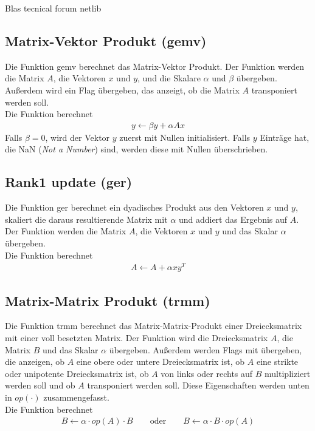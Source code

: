 \cite{blast}
Blas tecnical forum netlib

\subsection{Matrix-Vektor Produkt (gemv)}
Die Funktion \glqq gemv\grqq{} berechnet das Matrix-Vektor Produkt.
Der Funktion werden die Matrix $A$, die Vektoren $x$ und $y$, und die Skalare $\alpha$ und $\beta$ übergeben. Außerdem wird ein Flag übergeben, das anzeigt, ob die Matrix $A$ transponiert werden soll.\\
Die Funktion berechnet
\begin{align}
y \leftarrow \beta  y + \alpha A x 
\end{align}
Falls $\beta = 0$, wird der Vektor $y$ zuerst mit Nullen initialisiert. Falls $y$ Einträge hat, die NaN (\textit{Not a Number}) sind, werden diese mit Nullen überschrieben.

\subsection{Rank1 update (ger)}
Die Funktion \glqq ger\grqq{}  berechnet ein dyadisches Produkt aus den Vektoren $x$ und $y$, skaliert die daraus resultierende Matrix mit $\alpha$ und addiert das Ergebnis auf $A$.\\
Der Funktion werden die Matrix $A$, die Vektoren $x$ und $y$ und das Skalar $\alpha$ übergeben.\\
Die Funktion berechnet
\begin{align}
A \leftarrow A + \alpha  x y^T
\end{align}

\subsection{Matrix-Matrix Produkt (trmm)} \label{fkt:trmm}
Die Funktion \glqq trmm\grqq{} berechnet das Matrix-Matrix-Produkt einer Dreiecksmatrix mit einer voll besetzten Matrix.
Der Funktion wird die Dreiecksmatrix $A$, die Matrix $B$ und das Skalar $\alpha$ übergeben. Außerdem werden Flags mit übergeben, die anzeigen, ob $A$ eine obere oder untere Dreiecksmatrix ist, ob $A$ eine strikte oder unipotente Dreiecksmatrix ist, ob $A$ von links oder rechts auf $B$ multipliziert werden soll und ob $A$ transponiert werden soll. Diese Eigenschaften werden unten in $op(\cdot)$ zusammengefasst. \\
Die Funktion berechnet
\begin{align}
B \leftarrow  \alpha \cdot op(A) \cdot B \qquad \text{oder} \qquad B \leftarrow  \alpha \cdot B \cdot op(A)
\end{align}
